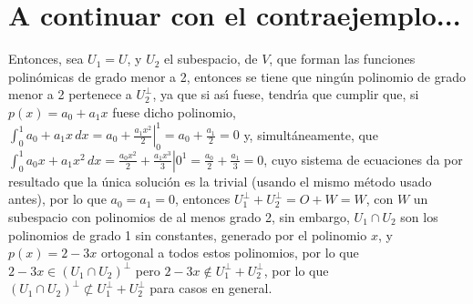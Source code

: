\documentclass[a4paper,11pt]{article}
\theoremstyle{teoremas}
\theoremstyle{ejemplos}
\theoremstyle{definiciones}
\theoremstyle{lemas}
\begin{document}
\section{A continuar con el contraejemplo...}

Entonces, sea $U_1 = U$, y $U_2$ el subespacio, de $V$, que forman las funciones polin\'omicas de grado menor a 2, entonces se tiene que ning\'un polinomio de grado menor a 2 pertenece a $U_2^{\perp}$, ya que si as\'{\i} fuese, tendr\'{\i}a que cumplir que, si $p(x) = a_0 + a_1x$ fuese dicho polinomio, $\int_0^1 a_0 + a_1x \, dx = \left. a_0 + \frac{a_1 x^2}{2} \right|_0^1 = a_0 + \frac{a_1}{2} = 0$ y, simult\'aneamente, que $\int_0^1 a_0x + a_1x^2 \, dx = \left. \frac{a_0 x^2}{2} + \frac{a_1x^3}{3} \right|0^1 = \frac{a_0}{2} + \frac{a_1}{3} = 0$, cuyo sistema de ecuaciones da por resultado que la \'unica soluci\'on es la trivial (usando el mismo m\'etodo usado antes), por lo que $a_0 = a_1 = 0$, entonces $U_1^{\perp} + U_2^{\perp} = O + W = W$, con $W$ un subespacio con polinomios de al menos grado 2, sin embargo, $U_1 \cap U_2$ son los polinomios de grado 1 sin constantes, generado por el polinomio $x$, y $p(x) = 2 - 3x$ ortogonal a todos estos polinomios, por lo que $2 - 3x \in \left( U_1 \cap U_2 \right)^{\perp}$ pero $2 - 3x \not\in U_1^{\perp} + U_2^{\perp}$, por lo que $\left( U_1 \cap U_2 \right)^{\perp} \not\subset U_1^{\perp} + U_2^{\perp}$ para casos en general.
\end{document}
